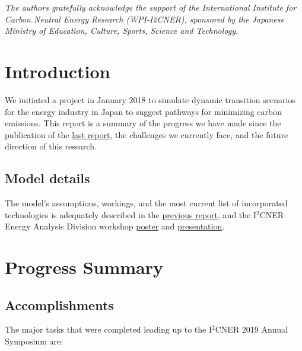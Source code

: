 \documentclass[14pt,a4paper]{article} %
\begin{document}
\begin{titlepage}

    \textit{The authors gratefully acknowledge the support of the International Institute for Carbon
Neutral Energy Research (WPI-I2CNER), sponsored by the Japanese Ministry of Education, Culture, Sports, Science and Technology.}  

\end{titlepage}

\section{Introduction}
We initiated a project in January 2018 to simulate dynamic transition scenarios for the energy industry in Japan to suggest pathways for minimizing carbon emissions. This report is a summary of the progress we have made since the publication of the \href{https://github.com/arfc/i2cner/tree/master/doc/2018-09-report}{last report}, the challenges we currently face, and the future direction of this research. \\

\subsection{Model details}
The model's assumptions, workings, and the most current list of incorporated technologies is adequately described in the \href{https://github.com/arfc/i2cner/tree/master/doc/2018-09-report}{previous report}, and the I$^2$CNER Energy Analysis Division workshop \href{https://github.com/arfc/i2cner/tree/master/doc/2019-01-poster}{poster} and \href{https://github.com/arfc/i2cner/tree/master/doc/2019-02-presentation}{presentation}.

\section{Progress Summary}

\subsection{Accomplishments}

The major tasks that were completed leading up to the I$^2$CNER 2019 Annual Symposium are:
\end{document}
